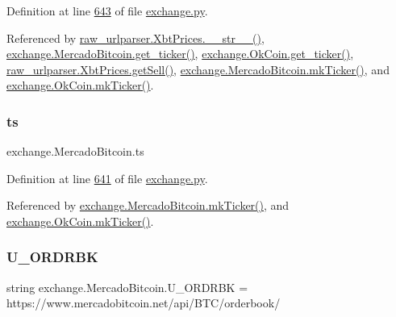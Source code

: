 Definition at line \hyperlink{exchange_8py_source_l00643}{643} of file \hyperlink{exchange_8py_source}{exchange.\+py}.



Referenced by \hyperlink{raw__urlparser_8py_source_l00074}{raw\+\_\+urlparser.\+Xbt\+Prices.\+\_\+\+\_\+str\+\_\+\+\_\+()}, \hyperlink{exchange_8py_source_l00651}{exchange.\+Mercado\+Bitcoin.\+get\+\_\+ticker()}, \hyperlink{exchange_8py_source_l00716}{exchange.\+Ok\+Coin.\+get\+\_\+ticker()}, \hyperlink{raw__urlparser_8py_source_l00065}{raw\+\_\+urlparser.\+Xbt\+Prices.\+get\+Sell()}, \hyperlink{exchange_8py_source_l00665}{exchange.\+Mercado\+Bitcoin.\+mk\+Ticker()}, and \hyperlink{exchange_8py_source_l00730}{exchange.\+Ok\+Coin.\+mk\+Ticker()}.

\mbox{\label{classexchange_1_1_mercado_bitcoin_ac4630b08e08f9eeb9dad838dc9dc0cda}} 
\subsubsection{\texorpdfstring{ts}{ts}}
{\footnotesize\ttfamily exchange.\+Mercado\+Bitcoin.\+ts}



Definition at line \hyperlink{exchange_8py_source_l00641}{641} of file \hyperlink{exchange_8py_source}{exchange.\+py}.



Referenced by \hyperlink{exchange_8py_source_l00665}{exchange.\+Mercado\+Bitcoin.\+mk\+Ticker()}, and \hyperlink{exchange_8py_source_l00730}{exchange.\+Ok\+Coin.\+mk\+Ticker()}.

\mbox{\label{classexchange_1_1_mercado_bitcoin_a7dd22c2c0261557a694678d8057d2547}} 
\subsubsection{\texorpdfstring{U\+\_\+\+O\+R\+D\+R\+BK}{U\_ORDRBK}}
{\footnotesize\ttfamily string exchange.\+Mercado\+Bitcoin.\+U\+\_\+\+O\+R\+D\+R\+BK = \textquotesingle{}https\+://www.\+mercadobitcoin.\+net/api/B\+TC/orderbook/\textquotesingle{}\hspace{0.3cm}{\ttfamily [static]}}



